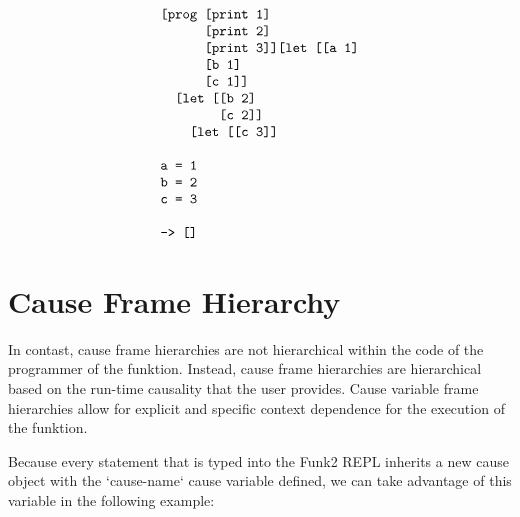 \begin{equation*}
\begin{array}{l}
\text{\tt [prog [print 1]} \\
\text{\tt ~~~~~~[print 2]} \\
\text{\tt ~~~~~~[print 3]]}

\text{\tt [let [[a 1]} \\
\text{\tt ~~~~~~[b 1]} \\
\text{\tt ~~~~~~[c 1]]} \\
\text{\tt ~~[let [[b 2]} \\
\text{\tt ~~~~~~~~[c 2]]} \\
\text{\tt ~~~~[let [[c 3]]} \\
\text{\tt } \\
\text{\tt a = 1} \\
\text{\tt b = 2} \\
\text{\tt c = 3} \\
\text{\tt } \\
\text{\tt --> []}
\end{array}
\end{equation*}

\section{Cause Frame Hierarchy}

In contast, cause frame hierarchies are not hierarchical within the
code of the programmer of the funktion.  Instead, cause frame
hierarchies are hierarchical based on the run-time causality that the
user provides.  Cause variable frame hierarchies allow for explicit
and specific context dependence for the execution of the funktion.

Because every statement that is typed into the Funk2 REPL inherits a
new cause object with the `cause-name` cause variable defined, we can
take advantage of this variable in the following example:

%
%
%
%
%
%
%

